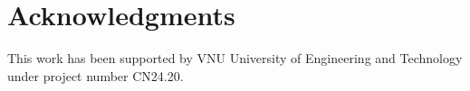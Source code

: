 
\section*{Acknowledgments}
This work has been supported by VNU University of Engineering and Technology under project number CN24.20.